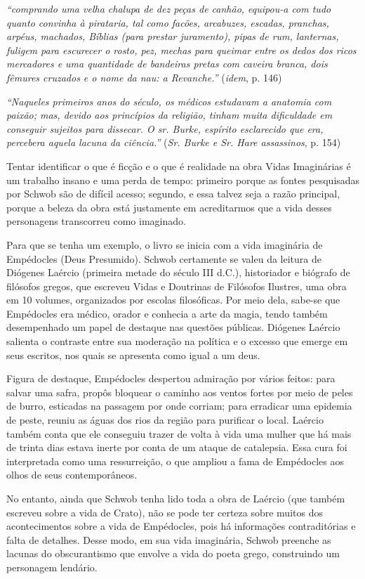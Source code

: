 \documentclass[12pt]{extarticle}
\begin{document}
\emph{``comprando uma velha chalupa de dez peças de canhão, equipou-a
com tudo quanto convinha à pirataria, tal como facões, arcabuzes,
escadas, pranchas, arpéus, machados, Bíblias (para prestar juramento),
pipas de rum, lanternas, fuligem para escurecer o rosto, pez, mechas
para queimar entre os dedos dos ricos mercadores e uma quantidade de
bandeiras pretas com caveira branca, dois fêmures cruzados e o nome da
nau: a Revanche.''} (\emph{idem}, p. 146)

\emph{``Naqueles primeiros anos do século, os médicos estudavam a
anatomia com paixão; mas, devido aos princípios da religião, tinham
muita dificuldade em conseguir sujeitos para dissecar. O sr. Burke,
espírito esclarecido que era, percebera aquela lacuna da ciência.''}
(\emph{Sr. Burke e Sr. Hare assassinos}, p. 154)

Tentar identificar o que é ficção e o que é realidade na obra Vidas
Imaginárias é um trabalho insano e uma perda de tempo: primeiro porque
as fontes pesquisadas por Schwob são de difícil acesso; segundo, e essa
talvez seja a razão principal, porque a beleza da obra está justamente
em acreditarmos que a vida desses personagens transcorreu como
imaginado.

Para que se tenha um exemplo, o livro se inicia com a vida imaginária
de Empédocles (Deus Presumido). Schwob certamente se valeu da leitura
de Diógenes Laércio (primeira metade do século III d.C.), historiador e
biógrafo de filósofos gregos, que escreveu Vidas e Doutrinas de
Filósofos Ilustres, uma obra em 10 volumes, organizados por escolas
filosóficas. Por meio dela, sabe-se que Empédocles era médico, orador e
conhecia a arte da magia, tendo também desempenhado um papel de destaque
nas questões públicas. Diógenes Laércio salienta o contraste entre sua
moderação na política e o excesso que emerge em seus escritos, nos quais
se apresenta como igual a um deus.

Figura de destaque, Empédocles despertou admiração por vários feitos:
para salvar uma safra, propôs bloquear o caminho aos ventos fortes por
meio de peles de burro, esticadas na passagem por onde corriam; para
erradicar uma epidemia de peste, reuniu as águas dos rios da região para
purificar o local. Laércio também conta que ele conseguiu trazer de
volta à vida uma mulher que há mais de trinta dias estava inerte por
conta de um ataque de catalepsia. Essa cura foi interpretada como uma
ressurreição, o que ampliou a fama de Empédocles aos olhos de seus
contemporâneos.

No entanto, ainda que Schwob tenha lido toda a obra de Laércio (que
também escreveu sobre a vida de Crato), não se pode ter certeza sobre
muitos dos acontecimentos sobre a vida de Empédocles, pois há
informações contraditórias e falta de detalhes. Desse modo, em sua vida
imaginária, Schwob preenche as lacunas do obscurantismo que envolve a
vida do poeta grego, construindo um personagem lendário.
\end{document}
